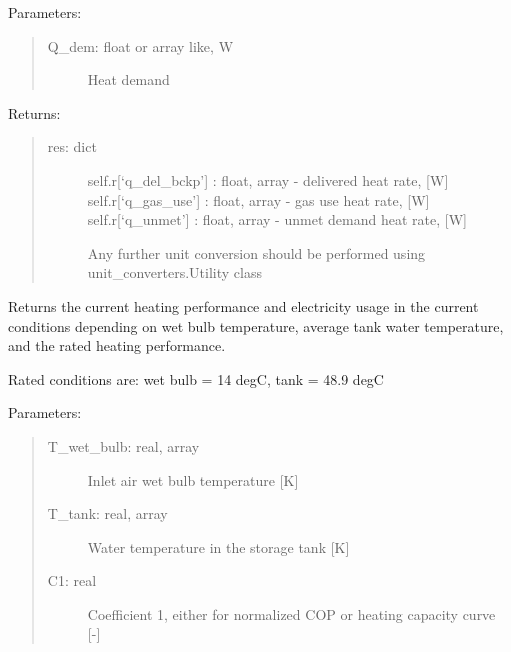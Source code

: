 \documentclass[letterpaper,10pt,english,openany]{sphinxmanual}
\begin{document}
\begin{fulllineitems}
\begin{fulllineitems}
Parameters:
\begin{quote}
\begin{description}
\item[{Q\_dem: float or array like, W}] \leavevmode
Heat demand

\end{description}
\end{quote}

Returns:
\begin{quote}
\begin{description}
\item[{res: dict}] \leavevmode
self.r{[}‘q\_del\_bckp’{]} : float, array - delivered heat rate, {[}W{]}
self.r{[}‘q\_gas\_use’{]} : float, array - gas use heat rate, {[}W{]}
self.r{[}‘q\_unmet’{]} : float, array - unmet demand heat rate, {[}W{]}

Any further unit conversion should be performed
using unit\_converters.Utility class

\end{description}
\end{quote}

\end{fulllineitems}


\begin{fulllineitems}
\label{\detokenize{source/mswh.system:mswh.system.components.Converter.heat_pump}}
Returns the current heating performance and electricity usage
in the current conditions depending on wet bulb temperature,
average tank water temperature, and the rated heating performance.

Rated conditions are: wet bulb = 14 degC, tank = 48.9 degC

Parameters:
\begin{quote}
\begin{description}
\item[{T\_wet\_bulb: real, array}] \leavevmode
Inlet air wet bulb temperature {[}K{]}

\item[{T\_tank: real, array}] \leavevmode
Water temperature in the storage tank {[}K{]}

\item[{C1: real}] \leavevmode
Coefficient 1, either for normalized COP or heating
capacity curve {[}-{]}


\end{description}
\end{quote}
\end{fulllineitems}
\end{fulllineitems}
\end{document}
